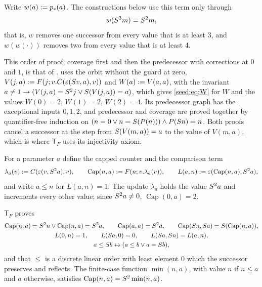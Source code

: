 Write $w(a)\mathrel{:=} p_*(a)$. The constructions below use this term only
through
\begin{equation}\label{seed:eq:W}
 w(S^3m)=S^2m ,
\end{equation}
that is, $w$ removes one successor from every value that is at least $3$,
and $w(w(\cdot))$ removes two from every value that is at least $4$.

\begin{remark}\label{seed:rem:tf-W}
This order of proof, coverage first and then the predecessor with
corrections at $0$ and $1$, is that of .
 uses the orbit without the guard at zero,
$V(j,a)\mathrel{:=} F(j;v.C(\varepsilon(S v,a),v))$ and $W(a)\mathrel{:=} V(a,a)$,
with the invariant
$a\neq1\to(V(j,a)=S^2j\lor S(V(j,a))=a)$, which gives
\eqref{seed:eq:W} for $W$ and the values $W(0)=2$, $W(1)=2$, $W(2)=4$. Its
predecessor graph has the exceptional inputs $0,1,2$, and predecessor and
coverage are proved together by quantifier-free induction on
$(n=0\lor n=S(P(n)))\land P(S n)=n$. Both proofs cancel a successor at
the step from $S(V(m,a))=a$ to the value of $V(m,a)$, which is where
$\mathsf{T}_F$ uses its injectivity axiom.
\end{remark}

For a parameter $a$ define the capped counter and the comparison term
\[
 \lambda_a(v)\mathrel{:=} C(\varepsilon(v,S^2a),v),\qquad
 \operatorname{Cap}(n,a)\mathrel{:=} F(n;v.\lambda_a(v)),\qquad
 L(a,n)\mathrel{:=}\varepsilon(\operatorname{Cap}(n,a),S^2a),
\]
and write $a\leq n$ for $L(a,n)=1$. The update $\lambda_a$ holds the value
$S^2a$ and increments every other value; since $S^2a\neq0$,
$\operatorname{Cap}(0,a)=2$.

\begin{lemma}\label{seed:lem:tf-order}
$\mathsf{T}_F$ proves
\begin{gather*}
 \operatorname{Cap}(n,a)=S^2n\lor\operatorname{Cap}(n,a)=S^2a,\qquad
 \operatorname{Cap}(a,a)=S^2a,\qquad
 \operatorname{Cap}(S n,S a)=S(\operatorname{Cap}(n,a)),\\
 L(0,n)=1,\qquad L(S a,0)=0,\qquad L(S a,S n)=L(a,n),\\
 a\leq S b\leftrightarrow(a\leq b\lor a=S b),
\end{gather*}
and that $\leq$ is a discrete linear order with least element $0$ which the
successor preserves and reflects. The finite-case function $\min(n,a)$, with
value $n$ if $n\leq a$ and $a$ otherwise, satisfies
$\operatorname{Cap}(n,a)=S^2\min(n,a)$.
\end{lemma}

